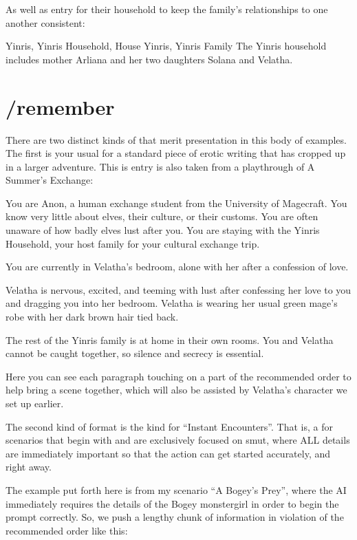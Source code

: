 \documentclass[Coomer-main.tex]{subfiles}
\begin{document}
As well as \wi entry for their household to keep the family’s relationships to one another consistent:

\begin{WI}{Yinris, Yinris Household, House Yinris, Yinris Family}
The Yinris household includes mother Arliana and her two daughters Solana and Velatha.
\end{WI}

\section{/remember}

There are two distinct kinds of \rem that merit presentation in this body of examples. The first is your usual \rem for a standard piece of erotic writing that has cropped up in a larger adventure. This is entry is also taken from a playthrough of A Summer’s Exchange:

\begin{/rm}
You are Anon, a human exchange student from the University of Magecraft. You know very little about elves, their culture, or their customs. You are often unaware of how badly elves lust after you. You are staying with the Yinris Household, your host family for your cultural exchange trip.
\bigskip

You are currently in Velatha’s bedroom, alone with her after a confession of love.
\bigskip

Velatha is nervous, excited, and teeming with lust after confessing her love to you and dragging you into her bedroom. Velatha is wearing her usual green mage’s robe with her dark brown hair tied back.
\bigskip

The rest of the Yinris family is at home in their own rooms. You and Velatha cannot be caught together, so silence and secrecy is essential.
\end{/rm}

Here you can see each paragraph touching on a part of the recommended order to help bring a scene together, which will also be assisted by Velatha’s character \wi we set up earlier.

The second kind of \rem format is the kind for “Instant Encounters”. That is, a \rem for scenarios that begin with and are exclusively focused on smut, where ALL details are immediately important so that the action can get started accurately, and right away.

The example put forth here is from my scenario “A Bogey’s Prey”, where the AI immediately requires the details of the Bogey monstergirl in order to begin the prompt correctly. So, we push a lengthy chunk of information in violation of the recommended order like this:
\end{document}
